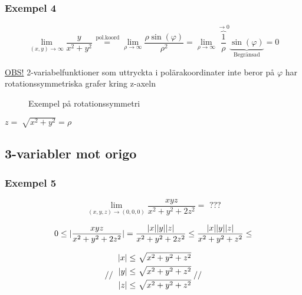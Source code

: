 \documentclass{article}
\DeclarePairedDelimiter \abs{\lvert}{\rvert}
\let\oldsqrt\sqrt
\renewcommand*{\sqrt}[2][\ ]{\oldsqrt[#1]{#2} }
\begin{document}
\newpage
\subsubsection{Exempel 4}

\begin{equation} \label{eq:2.4}
	\lim_{(x,y) \rightarrow \infty} \frac{y}{x^2+y^2} \overset{\,\mathrm{pol.koord}}{=} \lim_{\rho \rightarrow \infty} \frac{\rho \sin(\varphi)}{\rho^2} = 
	\lim_{\rho \rightarrow \infty} \overbrace{\frac{1}{\rho}}^{\rightarrow 0} \underbrace{\sin(\varphi)}_\text{Begränsad} = 0
\end{equation}

\underline{OBS!} 2-variabelfunktioner som uttryckta i polärakoordinater inte beror på $\varphi$ har rotationssymmetriska grafer kring z-axeln

\begin{figure}[ht]
\usetikzlibrary{3d}
\caption{Exempel på rotationssymmetri} \label{fig:2.3}
\end{figure}

\(
z = \sqrt{x^2+y^2} = \rho
\)

\subsection{3-variabler mot origo}
\subsubsection{Exempel 5} 

\begin{equation} \label{eq:2.5}
	\lim_{(x,y,z) \rightarrow (0,0,0)} \frac{xyz}{x^2+y^2+2z^2} = \text{ ???}
\end{equation}

\[
	0 \leq \abs{\frac{xyz}{x^2+y^2+2z^2}} = \frac{\abs{x}\abs{y}\abs{z}}{x^2+y^2+2z^2} \leq \frac{\abs{x}\abs{y}\abs{z}}{x^2+y^2+z^2} \leq 
\]

\[
	// 
	\def\arraystretch{1.1}
	\begin{blockarray}{r@{\;}l}
	\abs{x} \leq \sqrt{x^2+y^2+z^2} \\ [\jot]
	\abs{y} \leq \sqrt{x^2+y^2+z^2} \\ [\jot]
	\abs{z} \leq \sqrt{x^2+y^2+z^2}
	\end{blockarray}
	//
\]
\end{document}
